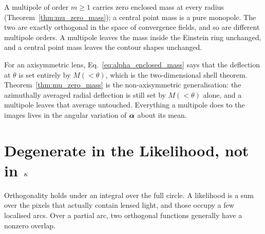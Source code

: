 \begin{keybox}
A multipole of order $m\ge1$ carries zero enclosed mass at
every radius (Theorem~\ref{thm:mu_zero_mass}); a central point mass is
a pure monopole.  The two are exactly orthogonal in the space
of convergence fields, and so are different multipole orders.  A
multipole leaves the mass inside the Einstein ring unchanged, and a
central point mass leaves the contour shapes unchanged.
\end{keybox}

\begin{bridge}
For an axisymmetric lens, Eq.~\eqref{eq:alpha_enclosed_mass} says that
the deflection at $\theta$ is set entirely by $M(<\theta)$, which is
the two-dimensional shell theorem.  Theorem~\ref{thm:mu_zero_mass} is the
non-axisymmetric generalisation: the azimuthally averaged radial
deflection is still set by $M(<\theta)$ alone, and a multipole leaves
that average untouched.  Everything a multipole does to the images
lives in the angular variation of $\boldsymbol{\alpha}$ about its mean.
\end{bridge}


\section{Degenerate in the Likelihood, not in \texorpdfstring{$\kappa$}{kappa}}
\label{sec:mu_likelihood}

Orthogonality holds under an integral over the full circle.  A
likelihood is a sum over the pixels that actually contain lensed
light, and those occupy a few localised arcs.  Over a partial arc, two
orthogonal functions generally have a nonzero overlap.

